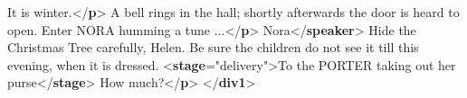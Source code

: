 \begin{shaded}
\hspace*{1em}\hspace*{1em}\hspace*{1em}\hspace*{1em} It is winter.{</\textbf{p}>}\mbox{}\newline 
\hspace*{1em}A bell rings in the hall; shortly afterwards the\mbox{}\newline 
\hspace*{1em}\hspace*{1em}\hspace*{1em}\hspace*{1em} door is heard to open. Enter NORA humming a tune ...{</\textbf{p}>}\mbox{}\newline 
{}\mbox{}\newline 
{}\mbox{}\newline 
\hspace*{1em}Nora{</\textbf{speaker}>}\mbox{}\newline 
\hspace*{1em}Hide the Christmas Tree carefully, Helen. Be sure the\mbox{}\newline 
\hspace*{1em}\hspace*{1em}\hspace*{1em}\hspace*{1em} children do not see it till this evening, when it is\mbox{}\newline 
\hspace*{1em}\hspace*{1em}\hspace*{1em}\hspace*{1em} dressed. {<\textbf{stage}\hspace*{1em}{type}="{delivery}">}To the PORTER taking\mbox{}\newline 
\hspace*{1em}\hspace*{1em}\hspace*{1em}\hspace*{1em}\hspace*{1em}\hspace*{1em} out her purse{</\textbf{stage}>} How much?{</\textbf{p}>}\mbox{}\newline 
{}\mbox{}\newline 
{</\textbf{div1}>}\end{shaded}\egroup\par \noindent  \par
